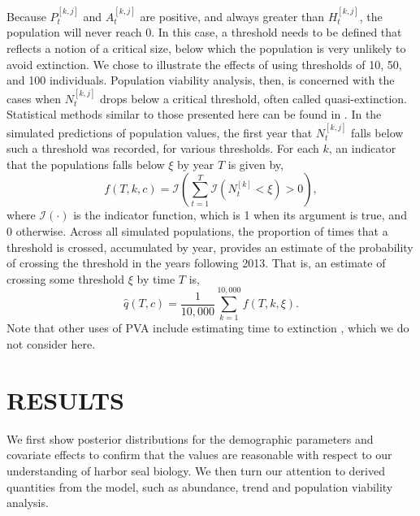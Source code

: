 \documentclass[12pt, titlepage]{article}\usepackage[]{graphicx}\usepackage[]{color}
\begin{document}
Because $P_t^{[k,j]}$ and $A_t^{[k,j]}$ are positive, and always greater than $ H_t^{[k,j]}$, the population will never reach 0.  In this case, a threshold needs to be defined that reflects a notion of a critical size, below which the population is very unlikely to avoid extinction.  We chose to illustrate the effects of using thresholds of 10, 50, and 100 individuals. Population viability analysis, then, is concerned with the cases when $N^{[k,j]}_t$ drops below a critical threshold, often called quasi-extinction.  Statistical methods similar to those presented here can be found in \citet{Holm:Sabo:Visc:Vinc:Faga:stat:2007}. In the simulated predictions of population values, the first year that $N^{[k,j]}_t$ falls below such a threshold was recorded, for various thresholds. For each $k$, an indicator that the populations falls below $\xi$ by year $T$ is given by, 
\[
f(T,k,c) = \mathcal{I}\left(\sum_{t=1}^T\mathcal{I}(N^{[k]}_t < \xi) > 0\right),
\]
where $\mathcal{I}(\cdot)$ is the indicator function, which is 1 when its argument is true, and 0 otherwise. Across all simulated populations, the proportion of times that a threshold is crossed, accumulated by year, provides an estimate of the probability of crossing the threshold in the years following 2013.  That is, an estimate of crossing some threshold $\xi$ by time $T$ is,
\begin{equation} \label{eq:probThresh}
  \hat{q}(T,c) = \frac{1}{10,000} \sum_{k=1}^{10,000} f(T,k,\xi).
\end{equation}
Note that other uses of PVA include estimating time to extinction \citep{Tayl:reli:1995}, which we do not consider here.


\section{RESULTS}


We first show posterior distributions for the demographic parameters and covariate effects to confirm that the values are reasonable with respect to our understanding of harbor seal biology. We then turn our attention to derived quantities from the model, such as abundance, trend and population viability analysis.
\end{document}
